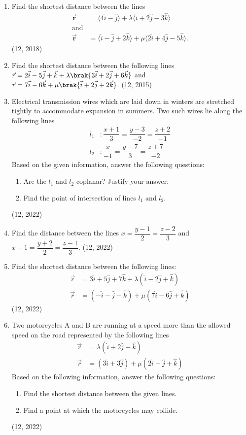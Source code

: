 \begin{enumerate}[label=\thesubsection.\arabic*,ref=\thesubsection.\theenumi]
\item Find the shortest distance between the lines 
\begin{align*}
\overrightarrow{\mathbf{r}} &= \langle 4\hat{i} - \hat{j} \rangle + \lambda \langle \hat{i} + 2\hat{j} - 3\hat{k} \rangle \\
\text{and} \\
\overrightarrow{\mathbf{r}} &= \langle \hat{i} - \hat{j} + 2\hat{k} \rangle + \mu \langle 2\hat{i} + 4\hat{j} - 5\hat{k} \rangle.
\end{align*}
\hfill (12, 2018)
\item Find the shortest distance between the following lines
$\vec{r} = 2\vec{i}-5\vec{j}+\vec{k} +\lambda\brak{3\vec{i}+2\vec{j}+6\vec{k}}$ and $\vec{r} = 7\vec{i}-6\vec{k}+\mu\brak{\vec{i}+2\vec{j}+2\vec{k}}$. \hfill (12, 2015)
\item Electrical transmission wires which are laid down in winters are stretched tightly to accommodate expansion in summers.
	Two such wires  lie along the following lines
	\begin{align}
		l_1 &: \dfrac{x+1}{3}=\dfrac{y-3}{-2}=\dfrac{z+2}{-1}\\
		l_2 &: \dfrac{x}{-1}=\dfrac{y-7}{3}=\dfrac{z+7}{-2}
	\end{align}
	Based on the given information, answer the following questions:
	\begin{enumerate}
		\item	Are the $l_1$ and $l_2$ coplanar? Justify your answer.
		\item    Find the point of intersection of lines $l_1$ and $l_2$.
	\end{enumerate}
\hfill (12, 2022)
\item Find the distance between the lines $x=\dfrac{y-1}{2}=\dfrac{z-2}{3}$ and $x+1=\dfrac{y+2}{2}=\dfrac{z-1}{3}$. \hfill (12, 2022)

\item Find the shortest distance between the following lines:
	\begin{align}
		\vec{r}&=3\hat{i}+5\hat{j}+7\hat{k}+\lambda(\hat{i}-2\hat{j}+\hat{k})\\
		\vec{r}&=(-\hat{i}-\hat{j}-\hat{k})+\mu(7\hat{i}-6\hat{j}+\hat{k})
	\end{align}
\hfill (12, 2022)
\item Two motorcycles A and B are running at a speed more than the allowed speed on the road  represented by the following lines 
	\begin{align}
		\vec{r}&=\lambda(\hat{i}+2\hat{j}-\hat{k})\\
		\vec{r}&=(3\hat{i}+3\hat{j})+\mu(2\hat{i}+\hat{j}+\hat{k})
	\end{align}
	Based on the following information, answer the following questions:
	\begin{enumerate}
		\item Find the shortest distance between the given lines.
		\item Find a point at which the motorcycles may collide.
	\end{enumerate}
\hfill (12, 2022)


\end{enumerate}
